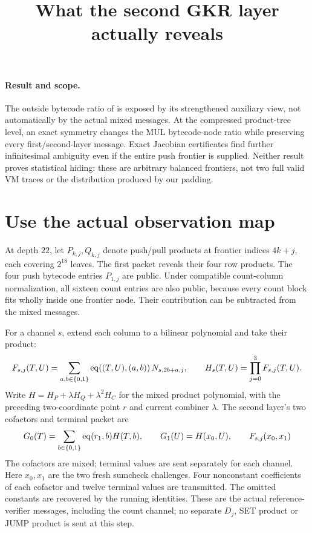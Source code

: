 \documentclass[11pt]{article}
\title{What the second GKR layer actually reveals}
\author{}
\date{}
\begin{document}
\maketitle
\vspace{-2em}

\paragraph{Result and scope.} The outside bytecode ratio of  is exposed by its strengthened auxiliary view, not automatically by the actual mixed messages. At the compressed product-tree level, an exact symmetry changes the MUL bytecode-node ratio while preserving every first/second-layer message. Exact Jacobian certificates find further infinitesimal ambiguity even if the entire push frontier is supplied. Neither result proves statistical hiding: these are arbitrary balanced frontiers, not two full valid VM traces or the distribution produced by our padding.

\section{Use the actual observation map}

At depth $22$, let $P_{k,j},Q_{k,j}$ denote push/pull products at frontier indices $4k+j$, each covering $2^{18}$ leaves. The first packet reveals their four row products. The four push bytecode entries $P_{1,j}$ are public. Under compatible count-column normalization, all sixteen count entries are also public, because every count block fits wholly inside one frontier node. Their contribution can be subtracted from the mixed messages.

For a channel $s$, extend each column to a bilinear polynomial and take their product:
\[
 F_{s,j}(T,U)=\sum_{a,b\in\{0,1\}}\operatorname{eq}((T,U),(a,b))\,N_{s,2b+a,j},
 \qquad H_s(T,U)=\prod_{j=0}^3F_{s,j}(T,U).
\]
Write $H=H_P+\lambda H_Q+\lambda^2H_C$ for the mixed product polynomial, with the preceding two-coordinate point $r$ and current combiner $\lambda$. The second layer's two cofactors and terminal packet are
\[
 G_0(T)=\sum_{b\in\{0,1\}}\operatorname{eq}(r_1,b)H(T,b),\qquad
 G_1(U)=H(x_0,U),\qquad F_{s,j}(x_0,x_1)
\]
The cofactors are mixed; terminal values are sent separately for each channel. Here $x_0,x_1$ are the two fresh sumcheck challenges. Four nonconstant coefficients of each cofactor and twelve terminal values are transmitted. The omitted constants are recovered by the running identities. These are the actual reference-verifier messages, including the count channel; no separate $D_j$, SET product or JUMP product is sent at this step.
\end{document}
